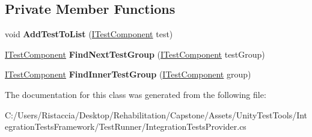 \subsection*{Private Member Functions}
\begin{DoxyCompactItemize}
\item 
\mbox{\label{class_unity_test_1_1_integration_test_runner_1_1_integration_tests_provider_ac75a89666fb8a9d835d505deb049d6a4}} 
void {\bfseries Add\+Test\+To\+List} (\hyperlink{interface_unity_test_1_1_i_test_component}{I\+Test\+Component} test)
\item 
\mbox{\label{class_unity_test_1_1_integration_test_runner_1_1_integration_tests_provider_ae4ef465dd6f71db6debf7e41a2c1bb4b}} 
\hyperlink{interface_unity_test_1_1_i_test_component}{I\+Test\+Component} {\bfseries Find\+Next\+Test\+Group} (\hyperlink{interface_unity_test_1_1_i_test_component}{I\+Test\+Component} test\+Group)
\item 
\mbox{\label{class_unity_test_1_1_integration_test_runner_1_1_integration_tests_provider_a7aacdda33f54591f0d401fefcbc85b0f}} 
\hyperlink{interface_unity_test_1_1_i_test_component}{I\+Test\+Component} {\bfseries Find\+Inner\+Test\+Group} (\hyperlink{interface_unity_test_1_1_i_test_component}{I\+Test\+Component} group)
\end{DoxyCompactItemize}


The documentation for this class was generated from the following file\+:\begin{DoxyCompactItemize}
\item 
C\+:/\+Users/\+Ristaccia/\+Desktop/\+Rehabilitation/\+Capstone/\+Assets/\+Unity\+Test\+Tools/\+Integration\+Tests\+Framework/\+Test\+Runner/Integration\+Tests\+Provider.\+cs\end{DoxyCompactItemize}
